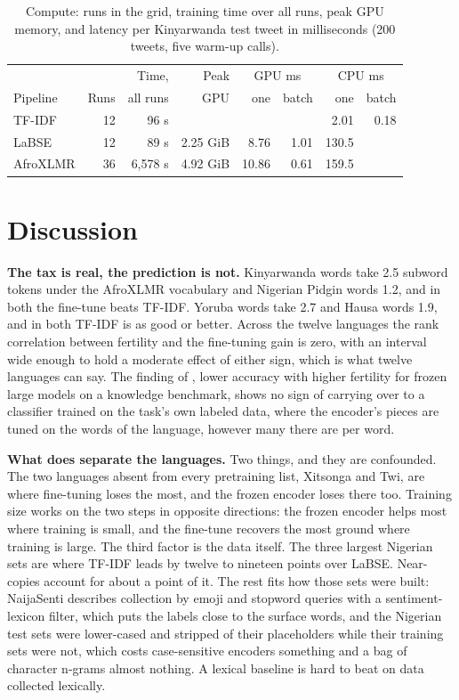\documentclass[11pt]{article}
\begin{document}
\begin{table}[t]
\centering
\scriptsize
\setlength{\tabcolsep}{3.5pt}
\begin{tabular}{lrrrrrrr}
\toprule
 & & Time, & Peak & \multicolumn{2}{c}{GPU ms} & \multicolumn{2}{c}{CPU ms} \\
Pipeline & Runs & all runs & GPU & one & batch & one & batch \\
\midrule
TF-IDF & 12 & 96 s &  &  &  & 2.01 & 0.18 \\
LaBSE & 12 & 89 s & 2.25 GiB & 8.76 & 1.01 & 130.5 &  \\
AfroXLMR & 36 & 6,578 s & 4.92 GiB & 10.86 & 0.61 & 159.5 &  \\
\bottomrule
\end{tabular}
\caption{Compute: runs in the grid, training time over all runs, peak GPU memory, and latency per Kinyarwanda test tweet in milliseconds (200 tweets, five warm-up calls).}
\label{tab:compute}
\end{table}

\section{Discussion}
\textbf{The tax is real, the prediction is not.} Kinyarwanda words take 2.5 subword tokens under the AfroXLMR vocabulary and Nigerian Pidgin words 1.2, and in both the fine-tune beats TF-IDF. Yoruba words take 2.7 and Hausa words 1.9, and in both TF-IDF is as good or better. Across the twelve languages the rank correlation between fertility and the fine-tuning gain is zero, with an interval wide enough to hold a moderate effect of either sign, which is what twelve languages can say. The finding of \citet{lundin2026tokentax}, lower accuracy with higher fertility for frozen large models on a knowledge benchmark, shows no sign of carrying over to a classifier trained on the task's own labeled data, where the encoder's pieces are tuned on the words of the language, however many there are per word.

\textbf{What does separate the languages.} Two things, and they are confounded. The two languages absent from every pretraining list, Xitsonga and Twi, are where fine-tuning loses the most, and the frozen encoder loses there too. Training size works on the two steps in opposite directions: the frozen encoder helps most where training is small, and the fine-tune recovers the most ground where training is large. The third factor is the data itself. The three largest Nigerian sets are where TF-IDF leads by twelve to nineteen points over LaBSE. Near-copies account for about a point of it. The rest fits how those sets were built: NaijaSenti describes collection by emoji and stopword queries with a sentiment-lexicon filter, which puts the labels close to the surface words, and the Nigerian test sets were lower-cased and stripped of their placeholders while their training sets were not, which costs case-sensitive encoders something and a bag of character n-grams almost nothing. A lexical baseline is hard to beat on data collected lexically.
\end{document}
